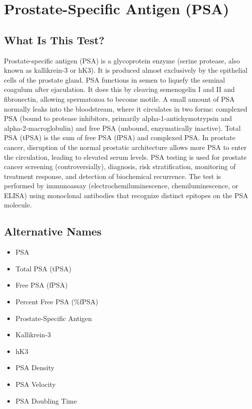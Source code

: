 \chapter{Prostate-Specific Antigen (PSA)}

\section*{What Is This Test?}
Prostate-specific antigen (PSA) is a glycoprotein enzyme (serine protease, also known as kallikrein-3 or hK3). It is produced almost exclusively by the epithelial cells of the prostate gland. PSA functions in semen to liquefy the seminal coagulum after ejaculation. It does this by cleaving semenogelin I and II and fibronectin, allowing spermatozoa to become motile. A small amount of PSA normally leaks into the bloodstream, where it circulates in two forms: complexed PSA (bound to protease inhibitors, primarily alpha-1-antichymotrypsin and alpha-2-macroglobulin) and free PSA (unbound, enzymatically inactive). Total PSA (tPSA) is the sum of free PSA (fPSA) and complexed PSA. In prostate cancer, disruption of the normal prostatic architecture allows more PSA to enter the circulation, leading to elevated serum levels. PSA testing is used for prostate cancer screening (controversially), diagnosis, risk stratification, monitoring of treatment response, and detection of biochemical recurrence. The test is performed by immunoassay (electrochemiluminescence, chemiluminescence, or ELISA) using monoclonal antibodies that recognize distinct epitopes on the PSA molecule.

\section*{Alternative Names}
\begin{itemize}
  \item PSA
  \item Total PSA (tPSA)
  \item Free PSA (fPSA)
  \item Percent Free PSA (\%fPSA)
  \item Prostate-Specific Antigen
  \item Kallikrein-3
  \item hK3
  \item PSA Density
  \item PSA Velocity
  \item PSA Doubling Time
\end{itemize}
